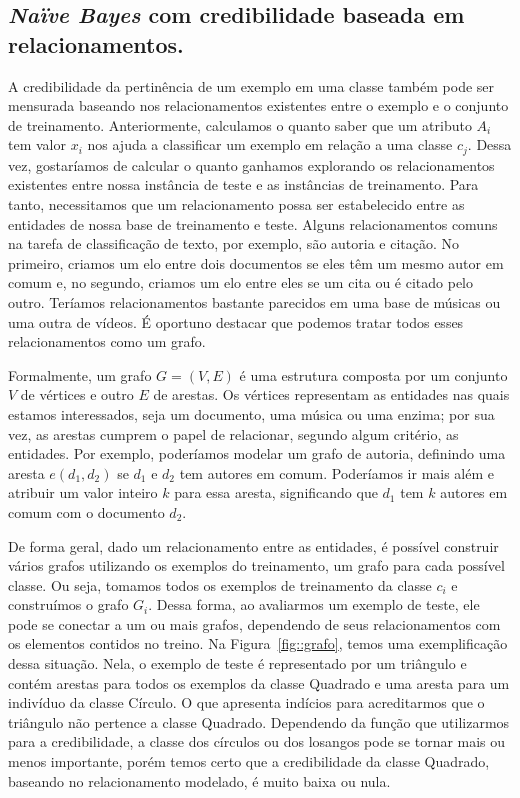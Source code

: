 
\subsection{\textit{Naïve Bayes} com credibilidade baseada em relacionamentos.}
\label{subsubsec::nbcredgrafos}

A credibilidade da pertinência de um exemplo em uma classe também pode ser mensurada baseando nos relacionamentos existentes entre o exemplo e o conjunto de treinamento. Anteriormente, calculamos o quanto saber que um atributo $A_i$ tem valor $x_i$ nos ajuda a classificar um exemplo em relação a uma classe $c_j$. Dessa vez, gostaríamos de calcular o quanto ganhamos explorando os relacionamentos existentes entre nossa instância de teste e as instâncias de treinamento. Para tanto, necessitamos que um relacionamento possa ser estabelecido entre as entidades de nossa base de treinamento e teste. Alguns relacionamentos comuns na tarefa de classificação de texto, por exemplo, são autoria e citação. No primeiro, criamos um elo entre dois documentos se eles têm um mesmo autor em comum e, no segundo, criamos um elo entre eles se um cita ou é citado pelo outro. Teríamos relacionamentos bastante parecidos em uma base de músicas ou uma outra de vídeos. É oportuno destacar que podemos tratar todos esses relacionamentos como um grafo.

Formalmente, um grafo $G = (V,E)$ é uma estrutura composta por um conjunto $V$ de vértices e outro $E$ de arestas. Os vértices representam as entidades nas quais estamos interessados, seja um documento, uma música ou uma enzima; por sua vez, as arestas cumprem o papel de relacionar, segundo algum critério, as entidades. Por exemplo, poderíamos modelar um grafo de autoria, definindo uma aresta $e(d_1,d_2)$ se $d_1$ e $d_2$ tem autores em comum. Poderíamos ir mais além e atribuir um valor inteiro $k$ para essa aresta, significando que $d_1$ tem $k$ autores em comum com o documento $d_2$.

De forma geral, dado um relacionamento entre as entidades, é possível construir vários grafos utilizando os exemplos do treinamento, um grafo para cada possível classe. Ou seja, tomamos todos os exemplos de treinamento da classe $c_i$ e construímos o grafo $G_i$. Dessa forma, ao avaliarmos um exemplo de teste, ele pode se conectar a um ou mais grafos, dependendo de seus relacionamentos com os elementos contidos no treino. Na Figura~\ref{fig::grafo}, temos uma exemplificação dessa situação. Nela, o exemplo de teste é representado por um triângulo e contém arestas para todos os exemplos da classe Quadrado e uma aresta para um indivíduo da classe Círculo. O que apresenta indícios para acreditarmos que o triângulo não pertence a classe Quadrado. Dependendo da função que utilizarmos para a credibilidade, a classe dos círculos ou dos losangos pode se tornar mais ou menos importante, porém temos certo que a credibilidade da classe Quadrado, baseando no relacionamento modelado, é muito baixa ou nula.

